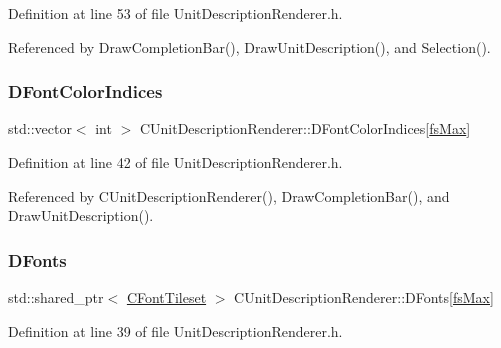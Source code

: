 Definition at line 53 of file Unit\+Description\+Renderer.\+h.



Referenced by Draw\+Completion\+Bar(), Draw\+Unit\+Description(), and Selection().

\hypertarget{classCUnitDescriptionRenderer_acb9416ccf452db38d4817711cd9d6abb}{}\label{classCUnitDescriptionRenderer_acb9416ccf452db38d4817711cd9d6abb} 
\subsubsection{\texorpdfstring{D\+Font\+Color\+Indices}{DFontColorIndices}}
{\footnotesize\ttfamily std\+::vector$<$ int $>$ C\+Unit\+Description\+Renderer\+::\+D\+Font\+Color\+Indices\mbox{[}\hyperlink{classCUnitDescriptionRenderer_a3ea4cd83b6dd9533ab3abb953a7da35aa74218e4708bac1eab359099eb0b159b2}{fs\+Max}\mbox{]}\hspace{0.3cm}{\ttfamily [protected]}}



Definition at line 42 of file Unit\+Description\+Renderer.\+h.



Referenced by C\+Unit\+Description\+Renderer(), Draw\+Completion\+Bar(), and Draw\+Unit\+Description().

\hypertarget{classCUnitDescriptionRenderer_a270a545ecdb1602cd2a0a2def8997dc8}{}\label{classCUnitDescriptionRenderer_a270a545ecdb1602cd2a0a2def8997dc8} 
\subsubsection{\texorpdfstring{D\+Fonts}{DFonts}}
{\footnotesize\ttfamily std\+::shared\+\_\+ptr$<$ \hyperlink{classCFontTileset}{C\+Font\+Tileset} $>$ C\+Unit\+Description\+Renderer\+::\+D\+Fonts\mbox{[}\hyperlink{classCUnitDescriptionRenderer_a3ea4cd83b6dd9533ab3abb953a7da35aa74218e4708bac1eab359099eb0b159b2}{fs\+Max}\mbox{]}\hspace{0.3cm}{\ttfamily [protected]}}



Definition at line 39 of file Unit\+Description\+Renderer.\+h.



